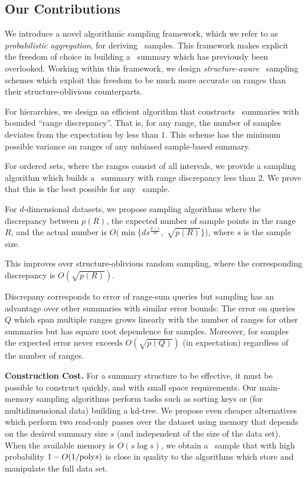 \documentclass[11pt]{article}
\begin{document}
\subsection{Our Contributions}
\noindent
We introduce a novel algorithmic sampling framework, 
which we refer to as {\em probabilistic aggregation}, 
for deriving \varopt\ samples.   
This framework makes explicit the freedom of choice in building a
\varopt\ summary which has previously been overlooked. 
Working within this framework, we design {\em structure-aware} 
 \varopt\ sampling schemes which exploit this freedom 
 to be much more accurate on ranges than 
 their structure-oblivious counterparts.


\begin{list}{}{\leftmargin=1em}
\item
For hierarchies, we design an efficient algorithm that constructs
\varopt\ summaries with bounded ``range discrepancy''.
That is, for any range, the number of samples deviates 
from the expectation by less than $1$.  
This scheme has the minimum possible variance on ranges of any
unbiased sample-based summary. 
\item For ordered sets, where the ranges consist of all intervals, 
we provide a sampling algorithm which builds a \varopt\ summary 
with range discrepancy less than $2$. 
We prove that this is the best possible for any \varopt\ sample.
\item For $d$-dimensional datasets, we propose sampling algorithms where
the discrepancy between  $p(R)$, the expected number of 
sample points in the range $R$, and the actual number is 
$O(\min\{d s^{\frac{d-1}{2d}},$ $
\sqrt{p(R)}\})$, 
where $s$ is the sample size.
\end{list}
This improves over structure-oblivious random sampling, 
where the corresponding discrepancy is $O(\sqrt{p(R)})$.

Discrepany corresponds to error of range-sum queries but
sampling has an advantage over other summaries
with similar error bounds:
The error on queries $Q$ which span multiple ranges grows linearly with the
number of ranges for other summaries but has square root dependence for samples. Moreover, for samples the expected error never exceeds $O(\sqrt{p(Q)})$ (in expectation) regardless of the number of ranges.

\smallskip
\noindent
{\bf Construction Cost.}
For a summary structure to be effective, it must be possible to
construct quickly, and with small space requirements. 
Our main-memory sampling algorithms perform tasks such as sorting
 keys or (for multidimensional data) building a kd-tree.  
We propose even cheaper alternatives which perform two read-only
 passes over the dataset using memory that depends on the desired
 summary size $s$ (and independent of the size of the data set).  When
 the available memory is $O(s\log s)$, 
we obtain a \varopt\ sample that with high probability 
$1-O(1/\textnormal{poly} s)$ is close in quality to the algorithms which store and
manipulate the full data set. 
\end{document}

